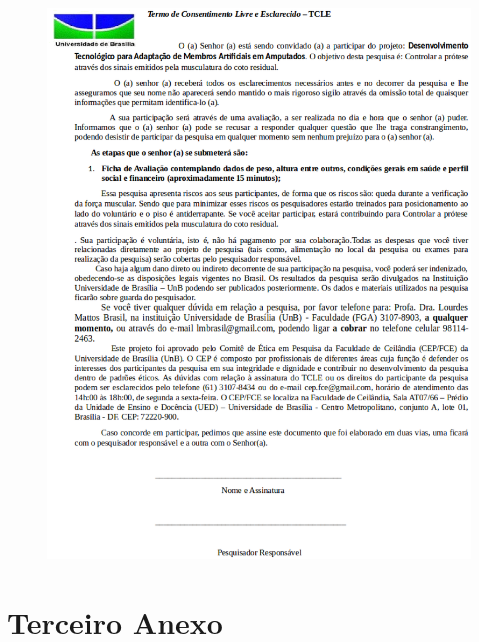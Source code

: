 \begin{anexosenv}
\begin{figure}[ht]
	    \centering
	    \label{fig22}
	        \includegraphics[keepaspectratio=true, scale=0.55]{editaveis/images/TCLE_amp.eps}
\end{figure} 

\newpage

\chapter{Terceiro Anexo}


\end{anexosenv}
